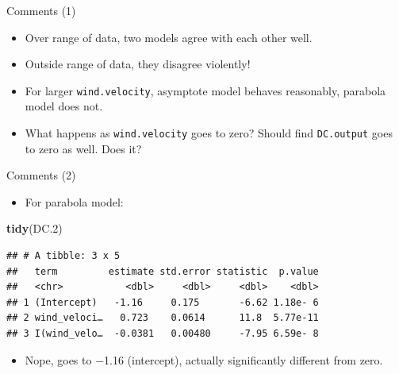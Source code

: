 \documentclass[
  ignorenonframetext,
]{beamer}
\newenvironment{Shaded}{\begin{snugshade}}{\end{snugshade}}
\newcommand{\FloatTok}[1]{\textcolor[rgb]{0.00,0.00,0.81}{#1}}
\newcommand{\KeywordTok}[1]{\textcolor[rgb]{0.13,0.29,0.53}{\textbf{#1}}}
\newcommand{\NormalTok}[1]{#1}
\providecommand{\tightlist}{%
  \setlength{\itemsep}{0pt}\setlength{\parskip}{0pt}}
\begin{document}
\begin{frame}[fragile]{Comments (1)}
\protect\hypertarget{comments-1-1}{}

\begin{itemize}
\tightlist
\item
  Over range of data, two models agree with each other well.
\item
  Outside range of data, they disagree violently!
\item
  For larger \texttt{wind.velocity}, asymptote model behaves reasonably,
  parabola model does not.
\item
  What happens as \texttt{wind.velocity} goes to zero? Should find
  \texttt{DC.output} goes to zero as well. Does it?
\end{itemize}

\end{frame}

\begin{frame}[fragile]{Comments (2)}
\protect\hypertarget{comments-2-1}{}

\begin{itemize}
\tightlist
\item
  For parabola model:
\end{itemize}

\begin{Shaded}
\begin{Highlighting}[]
\KeywordTok{tidy}\NormalTok{(DC}\FloatTok{.2}\NormalTok{)}
\end{Highlighting}
\end{Shaded}

\begin{verbatim}
## # A tibble: 3 x 5
##   term         estimate std.error statistic  p.value
##   <chr>           <dbl>     <dbl>     <dbl>    <dbl>
## 1 (Intercept)   -1.16     0.175       -6.62 1.18e- 6
## 2 wind_veloci…   0.723    0.0614      11.8  5.77e-11
## 3 I(wind_velo…  -0.0381   0.00480     -7.95 6.59e- 8
\end{verbatim}

\begin{itemize}
\tightlist
\item
  Nope, goes to −1.16 (intercept), actually significantly different from
  zero.
\end{itemize}

\end{frame}
\end{document}
